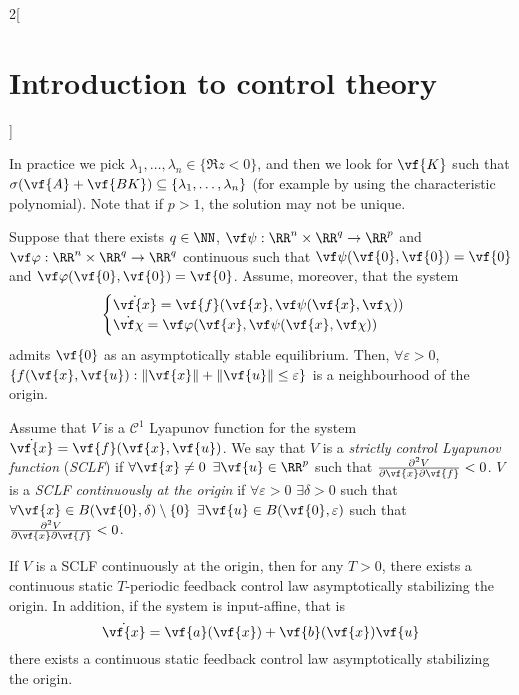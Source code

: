 \documentclass[../../../main_math.tex]{subfiles}
\begin{document}
\begin{multicols}{2}[\section{Introduction to control theory}]
\begin{theorem}
  \end{theorem}
  \begin{remark}
    In practice we pick $\lambda_1,\ldots,\lambda_n\in \{\Re z<0\}$, and then we look for $\vf{K}$ such that $\sigma(\vf{A}+\vf{BK})\subseteq \{\lambda_1,\ldots,\lambda_n\}$ (for example by using the characteristic polynomial). Note that if $p>1$, the solution may not be unique.
  \end{remark}
  \begin{theorem}
    Suppose that there exists $q\in \NN$, $\vf\psi:\RR^n\times \RR^q \to \RR^p$ and $\vf\varphi:\RR^n\times \RR^q \to \RR^q$ continuous such that $\vf\psi(\vf{0}, \vf{0}) = \vf{0}$ and $\vf\varphi(\vf{0}, \vf{0}) = \vf{0}$. Assume, moreover, that the system
    \begin{equation*}
      \begin{cases}
        \dot{\vf{x}} = \vf{f}(\vf{x}, \vf\psi(\vf{x}, \vf\chi)) \\
        \dot{\vf\chi} = \vf\varphi(\vf{x}, \vf\psi(\vf{x}, \vf\chi))
      \end{cases}
    \end{equation*}
    admits $\vf{0}$ as an asymptotically stable equilibrium. Then, $\forall \varepsilon>0$, $\{f(\vf{x}, \vf{u}): \norm{\vf{x}}+\norm{\vf{u}}\leq \varepsilon\}$ is a neighbourhood of the origin.
  \end{theorem}
  \begin{definition}
    Assume that $V$ is a $\mathcal{C}^1$ Lyapunov function for the system $\dot{\vf{x}} = \vf{f}(\vf{x}, \vf{u})$. We say that $V$ is a \emph{strictly control Lyapunov function} (\emph{SCLF}) if $\forall\vf{x}\ne 0$ $\exists \vf{u}\in \RR^p$ such that $\pdv{V}{\vf{x}}\vf{f}(\vf{x}, \vf{u})<0$. $V$ is a \emph{SCLF continuously at the origin} if $\forall\varepsilon>0$ $\exists \delta>0$ such that $\forall \vf{x}\in B(\vf{0},\delta)\setminus\{0\}$ $\exists \vf{u}\in B(\vf{0},\varepsilon)$ such that $\pdv{V}{\vf{x}}\vf{f}(\vf{x}, \vf{u})<0$.
  \end{definition}
  \begin{theorem}
    If $V$ is a SCLF continuously at the origin, then for any $T>0$, there exists a continuous static $T$-periodic feedback control law asymptotically stabilizing the origin. In addition, if the system is input-affine, that is
    \begin{equation}\label{ICT:inputaffine}
      \dot{\vf{x}} = \vf{a}(\vf{x}) + \vf{b}(\vf{x})\vf{u}
    \end{equation}
    there exists a continuous static feedback control law asymptotically stabilizing the origin.

\end{theorem}
\end{multicols}
\end{document}
